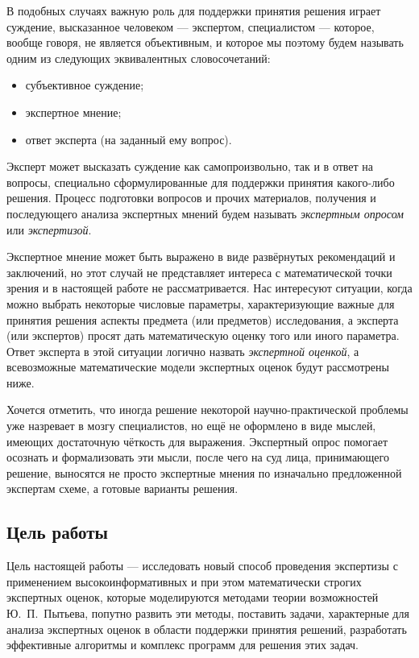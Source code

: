 В подобных случаях важную роль для поддержки принятия решения играет суждение, высказанное человеком --- экспертом, специалистом --- которое, вообще говоря, не является объективным, и которое мы поэтому будем называть одним из следующих эквивалентных словосочетаний:
 \begin{itemize}
	\item субъективное суждение;
	\item экспертное мнение;
	\item ответ эксперта (на заданный ему вопрос). 
 \end{itemize}
 
 Эксперт может высказать суждение как самопроизвольно, так и в ответ на вопросы, специально сформулированные для поддержки принятия какого-либо решения. Процесс подготовки вопросов и прочих материалов, получения и последующего анализа экспертных мнений будем называть {\sl экспертным опросом} или {\sl экспертизой}.
 
 Экспертное мнение может быть выражено в виде развёрнутых рекомендаций и заключений, но этот случай не представляет интереса с математической точки зрения и в настоящей работе не рассматривается. Нас интересуют ситуации, когда можно выбрать некоторые числовые параметры, характеризующие важные для принятия решения аспекты предмета (или предметов) исследования, а эксперта (или экспертов) просят дать математическую оценку того или иного параметра. Ответ эксперта в этой ситуации логично назвать {\sl экспертной оценкой}, а всевозможные математические модели экспертных оценок будут рассмотрены ниже.  
 
 Хочется отметить, что иногда решение некоторой научно-практической проблемы уже назревает в мозгу специалистов, но ещё не оформлено в виде мыслей, имеющих достаточную чёткость для выражения. Экспертный опрос помогает осознать и формализовать эти мысли, после чего на суд лица, принимающего решение, выносятся не просто экспертные мнения по изначально предложенной экспертам схеме, а готовые варианты решения. 

 \subsection{Цель работы}
 Цель настоящей работы --- исследовать новый способ проведения экспертизы с применением высокоинформативных и при этом математически строгих экспертных оценок, которые моделируются методами теории возможностей Ю.~П.~Пытьева, попутно развить эти методы, поставить задачи, характерные для анализа экспертных оценок в области поддержки принятия решений, разработать эффективные алгоритмы и комплекс программ  для решения этих задач. 

